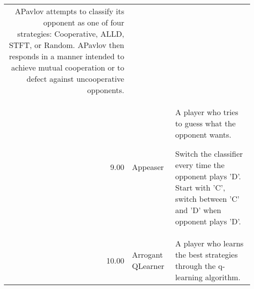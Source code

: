 \begin{table}[!hbtp]
\begin{adjustbox}{width=2\textwidth, angle=90}
\begin{tabular}{rll}
	APavlov attempts to classify its opponent as one of four strategies:
	Cooperative, ALLD, STFT, or Random. APavlov then responds in a manner
	intended to achieve mutual cooperation or to defect against
	uncooperative opponents.                                                                                                                                                                                                                                                                                                                                                                                                                                                                                                                                                                                                                                                            \\
	9.00   & Appeaser                    & A player who tries to guess what the opponent wants.

	Switch the classifier every time the opponent plays 'D'.
	Start with 'C', switch between 'C' and 'D' when opponent plays 'D'.                                                                                                                                                                                                                                                                                                                                                                                                                                                                                                                                                                                                                                                                                                                                                                                                                               \\
	10.00  & Arrogant QLearner           & A player who learns the best strategies through the q-learning algorithm.


\end{tabular}
\end{adjustbox}
\end{table}
